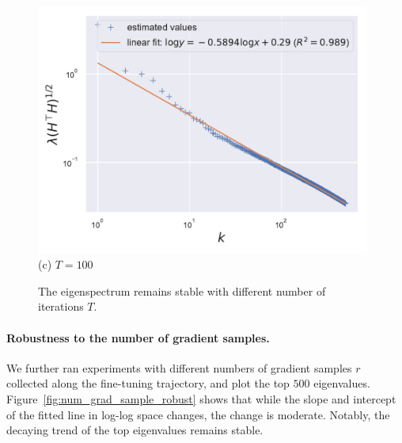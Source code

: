 \begin{figure}[thb]
\begin{center}
\begin{minipage}[t]{0.32\linewidth}
{\includegraphics[width=0.98\textwidth]{figs/privlm/roberta/npi_000100/eigenvalue-linfit.pdf}}
(c) $T=100$
\end{minipage}
\end{center}
\caption{
The eigenspectrum remains stable with different number of iterations $T$. 
}
\label{fig:num_power_iter_robust}
\end{figure}

\paragraph{Robustness to the number of gradient samples.}
We further ran experiments with different numbers of gradient samples $r$ collected along the fine-tuning trajectory, and plot the top $500$ eigenvalues.
Figure~\ref{fig:num_grad_sample_robust} shows that while the slope and intercept of the fitted line in log-log space changes, the change is moderate.
Notably, the decaying trend of the top eigenvalues remains stable.

